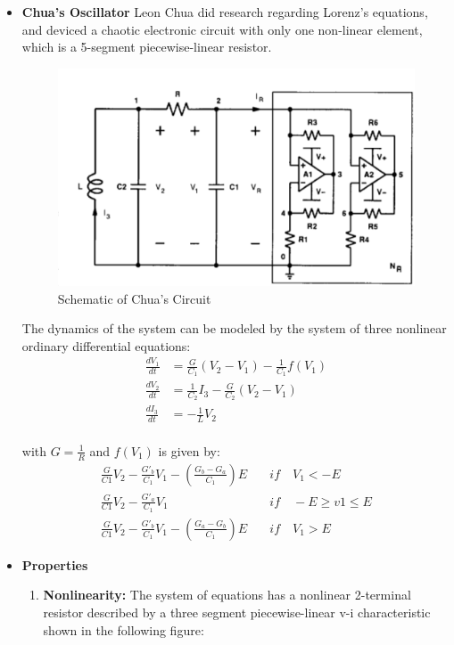 \begin{itemize}\item \textbf{Chua's Oscillator}
\newline Leon Chua did research regarding Lorenz's equations\cite{Ayrom86}\cite{Kennedy95}, and deviced a chaotic electronic circuit with only one non-linear element, which is a 5-segment piecewise-linear resistor.


\begin{figure}[h]
\centering
\includegraphics[scale=0.5]{imagenes/2-benford/chuas_circuit.png}
\caption{Schematic of Chua's Circuit }
\end{figure}

The dynamics of the system can be modeled by the system of three nonlinear ordinary differential equations:\\
\begin{align}
 \frac{dV_1}{dt}&=\frac{G}{C_1}(V_2-V_1)-\frac{1}{C_1}f(V_1)\\
 \frac{dV_2}{dt}&=\frac{1}{C_2}I_3-\frac{G}{C_2}(V_2-V_1)\\
 \frac{dI_3}{dt}&=-\frac{1}{L}V_2\\
\end{align}

with $G=\frac{1}{R}$ and $f(V_1)$ is given by:\\
\begin{align*}
\frac{G}{C1}V_2-\frac{G'_b}{C_1}V_1-(\frac{G_b-G_a}{C_1})E &\quad if \quad V_1< -E\\
\frac{G}{C1}V_2-\frac{G'_a}{C_1}V_1 &\quad if \quad -E\geq v1 \leq E\\
\frac{G}{C1}V_2-\frac{G'_b}{C_1}V_1-(\frac{G_a-G_b}{C_1})E &\quad if \quad V_1>E
\end{align*}
\item \textbf{Properties}
      \begin{enumerate}
       \item \textbf{Nonlinearity:} The system of equations has a nonlinear 2-terminal resistor described by a three segment piecewise-linear v-i characteristic shown in the following figure:



\end{enumerate}
\end{itemize}
